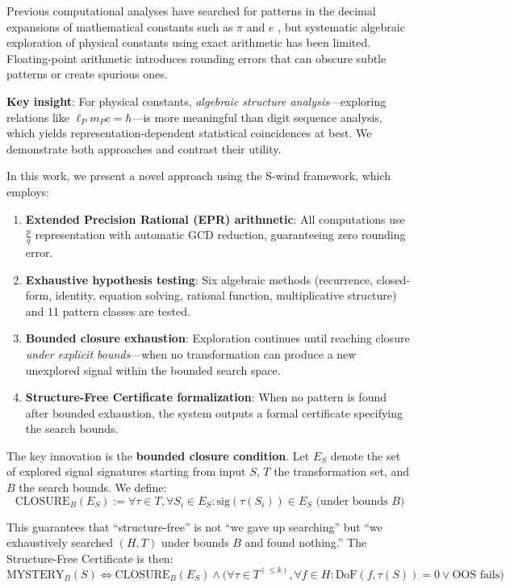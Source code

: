 \documentclass[twocolumn,showpacs,preprintnumbers,amsmath,amssymb,prl]{revtex4-2}
\begin{document}
Previous computational analyses have searched for patterns in the decimal expansions of mathematical constants such as $\pi$ and $e$ \cite{bailey1997}, but systematic algebraic exploration of physical constants using exact arithmetic has been limited. Floating-point arithmetic introduces rounding errors that can obscure subtle patterns or create spurious ones.

\textbf{Key insight}: For physical constants, \textit{algebraic structure analysis}---exploring relations like $\ell_P m_P c = \hbar$---is more meaningful than digit sequence analysis, which yields representation-dependent statistical coincidences at best. We demonstrate both approaches and contrast their utility.

In this work, we present a novel approach using the S-wind framework, which employs:
\begin{enumerate}
    \item \textbf{Extended Precision Rational (EPR) arithmetic}: All computations use $\frac{p}{q}$ representation with automatic GCD reduction, guaranteeing zero rounding error.
    \item \textbf{Exhaustive hypothesis testing}: Six algebraic methods (recurrence, closed-form, identity, equation solving, rational function, multiplicative structure) and 11 pattern classes are tested.
    \item \textbf{Bounded closure exhaustion}: Exploration continues until reaching closure \textit{under explicit bounds}---when no transformation can produce a new unexplored signal within the bounded search space.
    \item \textbf{Structure-Free Certificate formalization}: When no pattern is found after bounded exhaustion, the system outputs a formal certificate specifying the search bounds.
\end{enumerate}

The key innovation is the \textbf{bounded closure condition}. Let $E_S$ denote the set of explored signal signatures starting from input $S$, $T$ the transformation set, and $B$ the search bounds. We define:
\begin{equation}
\boxed{\text{CLOSURE}_B(E_S) := \forall \tau \in T, \forall S_i \in E_S: \text{sig}(\tau(S_i)) \in E_S \text{ (under bounds } B \text{)}}
\end{equation}

This guarantees that ``structure-free'' is not ``we gave up searching'' but ``we exhaustively searched $(H,T)$ under bounds $B$ and found nothing.'' The Structure-Free Certificate is then:
\begin{equation}
\text{MYSTERY}_B(S) \Leftrightarrow \text{CLOSURE}_B(E_S) \land \Big(\forall \tau \in T^{(\leq k)}, \forall f \in H: \text{DoF}(f,\tau(S))=0 \lor \text{OOS fails}\Big)
\end{equation}
\end{document}
